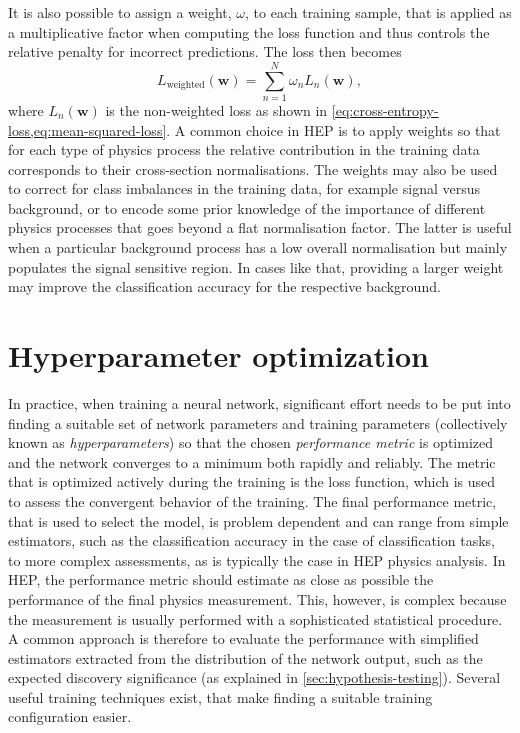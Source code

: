 It is also possible to assign a weight, $\omega$, to each training sample, that is applied as a multiplicative factor when computing the loss function and thus controls the relative penalty for incorrect predictions. The loss then becomes
\begin{equation}
    L_{\text{weighted}}(\pmb{w}) = \sum _{n=1}^{N} \omega_n L_n(\pmb{w}), 
\end{equation}
where $L_n(\pmb{w})$ is the non-weighted loss as shown in \cref{eq:cross-entropy-loss,eq:mean-squared-loss}. 
A common choice in HEP is to apply weights so that for each type of physics process the relative contribution in the training data corresponds to their cross-section normalisations.
The weights may also be used to correct for class imbalances in the training data, for example signal versus background, or to encode some prior knowledge of the importance of different physics processes that goes beyond a flat normalisation factor. The latter is useful when a particular background process has a low overall normalisation but mainly populates the signal sensitive region. In cases like that, providing a larger weight may improve the classification accuracy for the respective background. 


\section{Hyperparameter optimization} 
In practice, when training a neural network, significant effort needs to be put into finding a suitable set of network parameters and training parameters (collectively known as \emph{hyperparameters}) so that the chosen \emph{performance metric} is optimized and the network converges to a minimum both rapidly and reliably. 
The metric that is optimized actively during the training is the loss function, which is used to assess the convergent behavior of the training. 
The final performance metric, that is used to select the model, is problem dependent and can range from simple estimators, such as the classification accuracy in the case of classification tasks, to more complex assessments, as is typically the case in HEP physics analysis.
In HEP, the performance metric should estimate as close as possible the performance of the final physics measurement. This, however, is complex because the measurement is usually performed with a sophisticated statistical procedure. 
A common approach is therefore to evaluate the performance with simplified estimators extracted from the distribution of the network output, such as the expected discovery significance (as explained in \cref{sec:hypothesis-testing}).
Several useful training techniques exist, that make finding a suitable training configuration easier.

